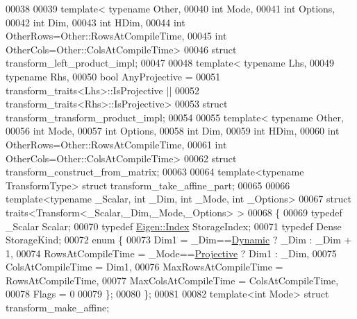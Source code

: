 \begin{DoxyCode}
00038 
00039 \textcolor{keyword}{template}< \textcolor{keyword}{typename} Other,
00040           \textcolor{keywordtype}{int} Mode,
00041           \textcolor{keywordtype}{int} Options,
00042           \textcolor{keywordtype}{int} Dim,
00043           \textcolor{keywordtype}{int} HDim,
00044           \textcolor{keywordtype}{int} OtherRows=Other::RowsAtCompileTime,
00045           \textcolor{keywordtype}{int} OtherCols=Other::ColsAtCompileTime>
00046 \textcolor{keyword}{struct }transform\_left\_product\_impl;
00047 
00048 \textcolor{keyword}{template}< \textcolor{keyword}{typename} Lhs,
00049           \textcolor{keyword}{typename} Rhs,
00050           \textcolor{keywordtype}{bool} AnyProjective = 
00051             transform\_traits<Lhs>::IsProjective ||
00052             transform\_traits<Rhs>::IsProjective>
00053 \textcolor{keyword}{struct }transform\_transform\_product\_impl;
00054 
00055 \textcolor{keyword}{template}< \textcolor{keyword}{typename} Other,
00056           \textcolor{keywordtype}{int} Mode,
00057           \textcolor{keywordtype}{int} Options,
00058           \textcolor{keywordtype}{int} Dim,
00059           \textcolor{keywordtype}{int} HDim,
00060           \textcolor{keywordtype}{int} OtherRows=Other::RowsAtCompileTime,
00061           \textcolor{keywordtype}{int} OtherCols=Other::ColsAtCompileTime>
00062 \textcolor{keyword}{struct }transform\_construct\_from\_matrix;
00063 
00064 \textcolor{keyword}{template}<\textcolor{keyword}{typename} TransformType> \textcolor{keyword}{struct }transform\_take\_affine\_part;
00065 
00066 \textcolor{keyword}{template}<\textcolor{keyword}{typename} \_Scalar, \textcolor{keywordtype}{int} \_Dim, \textcolor{keywordtype}{int} \_Mode, \textcolor{keywordtype}{int} \_Options>
00067 \textcolor{keyword}{struct }traits<Transform<\_Scalar,\_Dim,\_Mode,\_Options> >
00068 \{
00069   \textcolor{keyword}{typedef} \_Scalar Scalar;
00070   \textcolor{keyword}{typedef} \hyperlink{namespace_eigen_a62e77e0933482dafde8fe197d9a2cfde}{Eigen::Index} StorageIndex;
00071   \textcolor{keyword}{typedef} Dense StorageKind;
00072   \textcolor{keyword}{enum} \{
00073     Dim1 = \_Dim==\hyperlink{namespace_eigen_ad81fa7195215a0ce30017dfac309f0b2}{Dynamic} ? \_Dim : \_Dim + 1,
00074     RowsAtCompileTime = \_Mode==\hyperlink{group__enums_ggaee59a86102f150923b0cac6d4ff05107aead6a2de12a17aaa4f5c523215dfccad}{Projective} ? Dim1 : \_Dim,
00075     ColsAtCompileTime = Dim1,
00076     MaxRowsAtCompileTime = RowsAtCompileTime,
00077     MaxColsAtCompileTime = ColsAtCompileTime,
00078     Flags = 0
00079   \};
00080 \};
00081 
00082 \textcolor{keyword}{template}<\textcolor{keywordtype}{int} Mode> \textcolor{keyword}{struct }transform\_make\_affine;

\end{DoxyCode}
